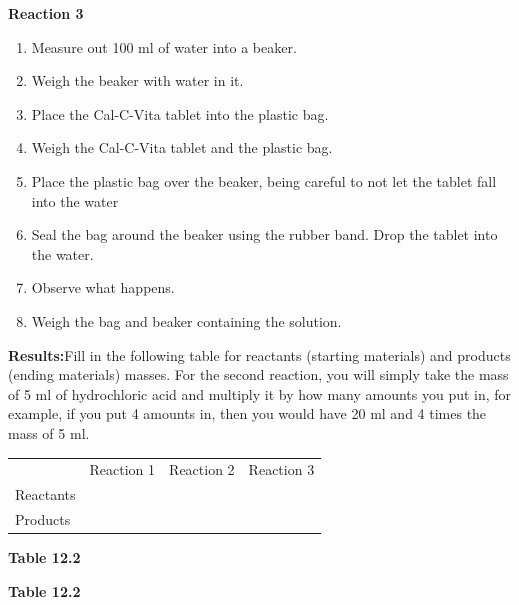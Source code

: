 \textbf{Reaction 3}
\label{m38711*id634223}\begin{enumerate}[noitemsep, label=\textbf{\arabic*}. ] 
            \item Measure out 100 ml of water into a beaker.\item Weigh the beaker with water in it.\item Place the Cal-C-Vita tablet into the plastic bag.\item Weigh the Cal-C-Vita tablet and the plastic bag.\item Place the plastic bag over the beaker, being careful to not let the tablet fall into the water\item Seal the bag around the beaker using the rubber band. Drop the tablet into the water.\item Observe what happens.\item Weigh the bag and beaker containing the solution.\end{enumerate}
        \par \label{m38711*eip-768}\noindent{}\textbf{Results:}Fill in the following table for reactants (starting materials) and products (ending materials) masses. For the second reaction, you will simply take the mass of 5 ml of hydrochloric acid and multiply it by how many amounts you put in, for example, if you put 4 amounts in, then you would have 20 ml and 4 times the mass of 5 ml. \par 
          \begin{table}[H]
        \begin{center}
      \label{m38711*eip-581}
    \noindent
      \tablelasttail{}
      \begin{xtabular}[t]{|l|l|l|l|}\hline
         &
        Reaction 1 &
        Reaction 2 &
        Reaction 3%
     \tabularnewline{}
        Reactants &
         &
         &
     \tabularnewline{}
        Products &
         &
         &
     \tabularnewline{}
    \end{xtabular}
      \end{center}
    \begin{center}{\small\bfseries Table 12.2}\end{center}
    \begin{caption}{\small\bfseries Table 12.2}\end{caption}
\end{table}

